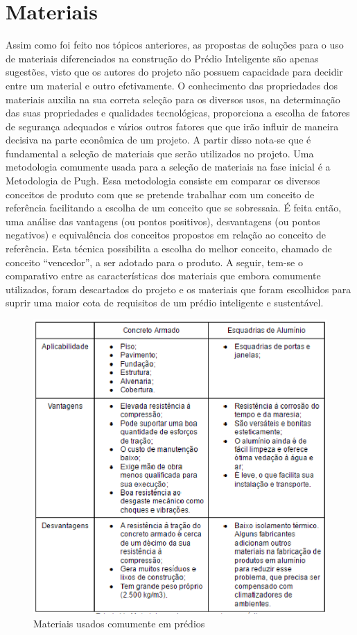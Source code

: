 \section{Materiais}
Assim como foi feito nos tópicos anteriores, as propostas de soluções para o uso de materiais diferenciados na construção do Prédio Inteligente são apenas sugestões, visto que os autores do projeto não possuem capacidade para decidir entre um material e outro efetivamente. O conhecimento das propriedades dos materiais auxilia na sua correta seleção para os diversos usos, na determinação das suas propriedades e qualidades tecnológicas, proporciona a escolha de fatores de segurança adequados e vários outros fatores que que irão influir de maneira decisiva na parte econômica de um projeto.
A partir disso nota-se que é fundamental a seleção de materiais que serão utilizados no projeto. Uma metodologia comumente usada para a seleção de materiais na fase inicial é a Metodologia de Pugh. Essa metodologia consiste em comparar os diversos conceitos de produto com que se pretende trabalhar com um conceito de referência facilitando a escolha de um conceito que se sobressaia.
É feita então, uma análise das vantagens (ou pontos positivos), desvantagens (ou pontos negativos) e equivalência dos conceitos propostos em relação ao conceito de referência. Esta técnica possibilita a escolha do melhor conceito, chamado de conceito “vencedor”, a ser adotado para o produto. A seguir, tem-se o comparativo entre as características dos materiais que embora comumente utilizados, foram descartados do projeto e os materiais que foram escolhidos para suprir uma maior cota de requisitos de um prédio inteligente e sustentável.

\begin{figure}[!h]
\centering
\includegraphics[keepaspectratio=true,scale=1]{figuras/materiais_usados_comumente_em_predios.eps}
\caption{Materiais usados comumente em prédios}
\end{figure}

